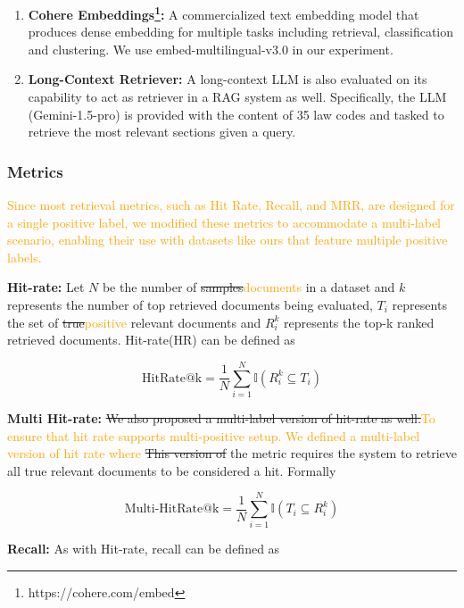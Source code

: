 \begin{enumerate}
    \item \textbf{Cohere Embeddings\footnote{https://cohere.com/embed}: } A commercialized text embedding model that produces dense embedding for multiple tasks including retrieval, classification and clustering. We use embed-multilingual-v3.0 in our experiment. 
    \item \textbf{Long-Context Retriever: } A long-context LLM is also evaluated on its capability to act as retriever in a RAG system as well. Specifically, the LLM (Gemini-1.5-pro) is provided with the content of 35 law codes and tasked to retrieve the most relevant sections given a query.
    
\end{enumerate}

\subsubsection{Metrics}
\label{subsubsec:re_metrics}

\textcolor{orange}{Since most retrieval metrics, such as Hit Rate, Recall, and MRR, are designed for a single positive label, we modified these metrics to accommodate a multi-label scenario, enabling their use with datasets like ours that feature multiple positive labels.}

\textbf{Hit-rate: }Let $N$ be the number of \st{samples}\textcolor{orange}{documents} in a dataset and $k$ represents the number of top retrieved documents being evaluated, $T_i$ represents the set of \st{true}\textcolor{orange}{positive} relevant documents and $R_i^k$ represents the top-k ranked retrieved documents. Hit-rate(HR) can be defined as

\begin{equation}
    \text{HitRate@k}=\frac{1}{N}\sum_{i=1}^{N}\mathbb{I}(R_i^k\subseteq T_i) 
\end{equation}

\textbf{Multi Hit-rate: } \st{We also proposed a multi-label version of hit-rate as well.}\textcolor{orange}{To ensure that hit rate supports multi-positive setup. We defined a multi-label version of hit rate where} \st{This version of} the metric requires the system to retrieve all true relevant documents to be considered a hit. Formally

\begin{equation}
    \text{Multi-HitRate@k}=\frac{1}{N}\sum_{i=1}^{N}\mathbb{I}(T_i\subseteq R_i^k)
\end{equation}

\textbf{Recall: }As with Hit-rate, recall can be defined as

